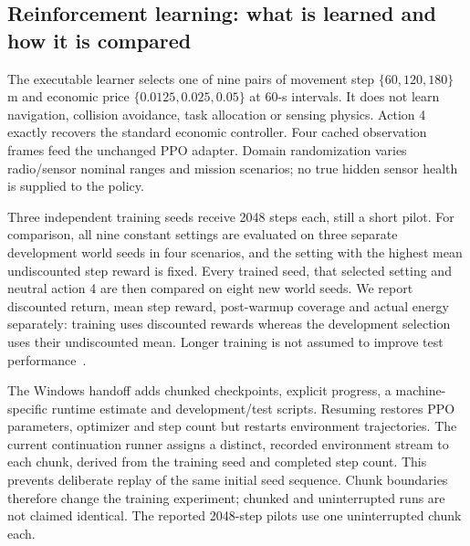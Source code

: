 \subsection{Reinforcement learning: what is learned and how it is compared}
The executable learner selects one of nine pairs of movement step
$\{60,120,180\}$ m and economic price $\{0.0125,0.025,0.05\}$ at 60-s intervals.
It does not learn navigation, collision avoidance, task allocation or sensing
physics. Action 4 exactly recovers the standard economic controller.
Four cached observation frames feed the unchanged PPO adapter. Domain
randomization varies radio/sensor nominal ranges and mission scenarios; no true
hidden sensor health is supplied to the policy.

Three independent training seeds receive 2048 steps each, still a short pilot.
For comparison, all nine constant settings are evaluated on three separate
development world seeds in four scenarios, and the setting with the highest
mean undiscounted step reward is fixed. Every trained seed, that selected setting
and neutral action 4 are then compared on eight new world seeds. We report
discounted return, mean step reward, post-warmup coverage and actual energy
separately: training uses discounted rewards whereas the development selection
uses their undiscounted mean. Longer training is not assumed to improve test
performance~\cite{sb3tips}.



The Windows handoff adds chunked checkpoints, explicit progress, a machine-specific
runtime estimate and development/test scripts. Resuming restores PPO parameters,
optimizer and step count but restarts environment trajectories. The current continuation runner assigns a distinct, recorded environment stream to each chunk, derived from the training seed and completed step count. This prevents deliberate replay of the same initial seed sequence. Chunk boundaries
therefore change the training experiment; chunked and uninterrupted runs are not
claimed identical. The reported 2048-step pilots use one uninterrupted chunk each.
